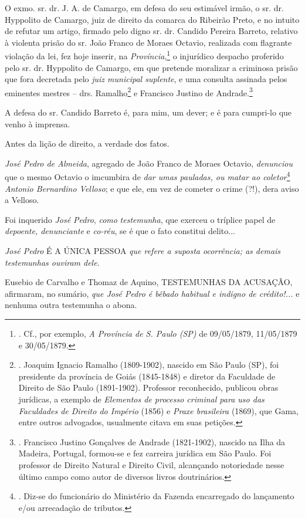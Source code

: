 O exmo. sr. dr. J. A. de Camargo, em defesa do seu estimável irmão, o
sr. dr. Hyppolito de Camargo, juiz de direito da comarca do Ribeirão
Preto, e no intuito de refutar um artigo, firmado pelo digno sr. dr.
Candido Pereira Barreto, relativo à violenta prisão do sr. João Franco
de Moraes Octavio, realizada com flagrante violação da lei, fez hoje
inserir, na \emph{Província},\footnote{. Cf., por exemplo, \emph{A
  Província de S. Paulo (SP)} de 09/05/1879, 11/05/1879 e 30/05/1879.} o
injurídico despacho proferido pelo sr. dr. Hyppolito de Camargo, em que
pretende moralizar a criminosa prisão que fora decretada pelo \emph{juiz
municipal suplente}, e uma consulta assinada pelos eminentes mestres --
drs. Ramalho\footnote{. Joaquim Ignacio Ramalho (1809-1902), nascido em
  São Paulo (SP), foi presidente da província de Goiás (1845-1848) e
  diretor da Faculdade de Direito de São Paulo (1891-1902). Professor
  reconhecido, publicou obras jurídicas, a exemplo de \emph{Elementos de
  processo criminal para uso das Faculdades de Direito do Império}
  (1856) e \emph{Praxe brasileira} (1869), que Gama, entre outros
  advogados, usualmente citava em suas petições.} e Francisco Justino de
Andrade.\footnote{. Francisco Justino Gonçalves de Andrade (1821-1902),
  nascido na Ilha da Madeira, Portugal, formou-se e fez carreira
  jurídica em São Paulo. Foi professor de Direito Natural e Direito
  Civil, alcançando notoriedade nesse último campo como autor de
  diversos livros doutrinários.}

A defesa do sr. Candido Barreto é, para mim, um dever; e é para
cumpri-lo que venho à imprensa.

Antes da lição de direito, a verdade dos fatos.

\emph{José Pedro de Almeida}, agregado de João Franco de Moraes Octavio,
\emph{denunciou} que o mesmo Octavio o imcumbira de \emph{dar umas
pauladas, ou matar ao coletor}\footnote{. Diz-se do funcionário do
  Ministério da Fazenda encarregado do lançamento e/ou arrecadação de
  tributos.} \emph{Antonio Bernardino Velloso}; e que ele, em vez de
cometer o crime (?!), dera aviso a Velloso.

Foi inquerido \emph{José Pedro}, \emph{como} \emph{testemunha}, que
exerceu o tríplice papel de \emph{depoente, denunciante} e
\emph{co-réu}, se é que o fato constitui delito...

\emph{José Pedro} É A ÚNICA PESSOA \emph{que refere a suposta
ocorrência; as demais testemunhas ouviram dele}.

Eusebio de Carvalho e Thomaz de Aquino, TESTEMUNHAS DA ACUSAÇÃO,
afirmaram, no sumário, \emph{que José Pedro é bêbado habitual e indigno
de crédito!...} e nenhuma outra testemunha o abona.

